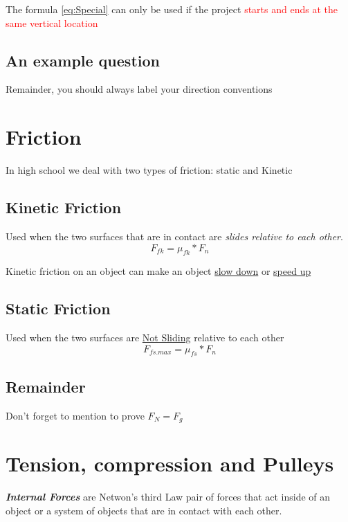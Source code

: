 The formula \ref{eq:Special} can only be used if the project \textcolor{red}{starts and ends at the same vertical location}
\newpage
\subsection{An example question}
Remainder, you should always label your direction conventions


\section{Friction}
In high school we deal with two types of friction: static and Kinetic

\subsection{Kinetic Friction}
Used when the two surfaces that are in contact are \textit{slides relative to each other}.
\begin{equation}
    F_{fk} = \mu_{fk} * F_{n}
\end{equation}

Kinetic friction on an object can make an object \underline{slow down} or \underline{speed up}

\subsection{Static Friction}
Used when the two surfaces are \underline{Not Sliding} relative to each other
\begin{equation}
    F_{fs.max} = \mu_{fs} * F_{n}
\end{equation}

\subsection{Remainder}
Don't forget to mention to prove \underline{$F_{N} = F_{g}$}

\section{Tension, compression and Pulleys}
\textbf{\textit{Internal Forces}} are Netwon's third Law pair of forces that act inside of an object or a system of objects
that are in contact with each other. \\

